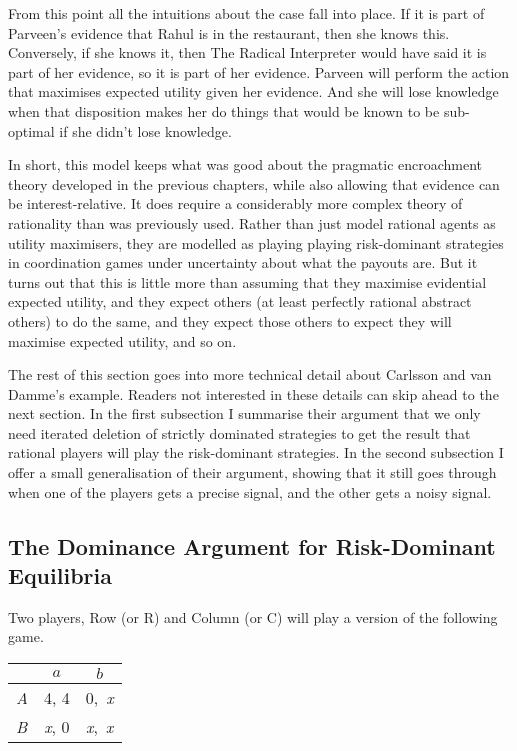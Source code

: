 \documentclass[
  11pt,
]{book}
\begin{document}
From this point all the intuitions about the case fall into place. If it is part of Parveen's evidence that Rahul is in the restaurant, then she knows this. Conversely, if she knows it, then The Radical Interpreter would have said it is part of her evidence, so it is part of her evidence. Parveen will perform the action that maximises expected utility given her evidence. And she will lose knowledge when that disposition makes her do things that would be known to be sub-optimal if she didn't lose knowledge.

In short, this model keeps what was good about the pragmatic encroachment theory developed in the previous chapters, while also allowing that evidence can be interest-relative. It does require a considerably more complex theory of rationality than was previously used. Rather than just model rational agents as utility maximisers, they are modelled as playing playing risk-dominant strategies in coordination games under uncertainty about what the payouts are. But it turns out that this is little more than assuming that they maximise evidential expected utility, and they expect others (at least perfectly rational abstract others) to do the same, and they expect those others to expect they will maximise expected utility, and so on.

The rest of this section goes into more technical detail about Carlsson and van Damme's example. Readers not interested in these details can skip ahead to the next section. In the first subsection I summarise their argument that we only need iterated deletion of strictly dominated strategies to get the result that rational players will play the risk-dominant strategies. In the second subsection I offer a small generalisation of their argument, showing that it still goes through when one of the players gets a precise signal, and the other gets a noisy signal.

\hypertarget{cvdproof}{%
\subsection{The Dominance Argument for Risk-Dominant Equilibria}\label{cvdproof}}

Two players, Row (or R) and Column (or C) will play a version of the following game.

\begin{longtable}[]{@{}lcc@{}}
\toprule()
& \(a\) & \(b\) \\
\midrule()
\endhead
\emph{A} & 4, 4 & 0,~\emph{x} \\
\emph{B} & \emph{x}, 0 & \emph{x},~\emph{x} \\
\bottomrule()
\end{longtable}
\end{document}
